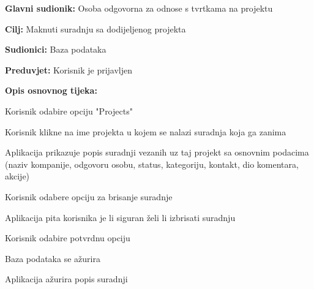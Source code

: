 					\noindent {}
					\begin{packed_item}

						\item \textbf{Glavni sudionik:} Osoba odgovorna za odnose s tvrtkama na projektu
						\item \textbf{Cilj:} Maknuti suradnju sa dodijeljenog projekta
						\item \textbf{Sudionici:} Baza podataka
						\item \textbf{Preduvjet:} Korisnik je prijavljen
						\item \textbf{Opis osnovnog tijeka:}

						\item[] \begin{packed_enum}

							\item Korisnik odabire opciju "Projects"
							\item Korisnik klikne na ime projekta u kojem se nalazi suradnja koja ga zanima
							\item Aplikacija prikazuje popis suradnji vezanih uz taj projekt sa osnovnim podacima (naziv kompanije, odgovoru osobu, status, kategoriju, kontakt, dio komentara, akcije)
                            \item Korisnik odabere opciju za brisanje suradnje
                            \item Aplikacija pita korisnika je li siguran želi li izbrisati suradnju
                            \item Korisnik odabire potvrdnu opciju
                            \item Baza podataka se ažurira
                            \item Aplikacija ažurira popis suradnji
                            
						\end{packed_enum}
					\end{packed_item}

